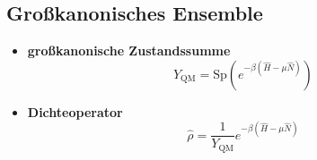 \documentclass{article}
\newcommand{\lr}[1]{\left(#1\right)}
\begin{document}
\subsection{Großkanonisches Ensemble}
	\begin{itemize}
		\item \textbf{großkanonische Zustandssumme}
			\begin{equation}
				Y_\text{QM} = \text{Sp} \lr{ e^{-\beta(\hat{H} - \mu\hat{N})} }
			\end{equation}
		
		
		\item \textbf{Dichteoperator}
			\begin{equation}
				\hat{\rho} = \frac{1}{Y_\text{QM}} e^{-\beta(\hat{H} - \mu\hat{N})}
			\end{equation}
	\end{itemize}

\newpage
\end{document}
